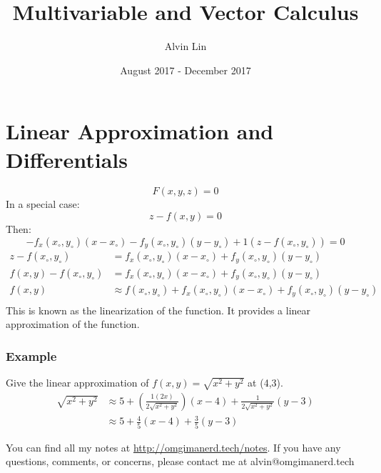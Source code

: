 \documentclass[letterpaper, 12pt]{math}
\title{Multivariable and Vector Calculus}
\author{Alvin Lin}
\date{August 2017 - December 2017}
\begin{document}
\maketitle

\section*{Linear Approximation and Differentials}
\[ F(x,y,z) = 0 \]
In a special case:
\[ z-f(x,y) = 0 \]
Then:
\[ -f_x(x_{\circ},y_{\circ})(x-x_{\circ})-f_y(x_{\circ},y_{\circ})(y-y_{\circ})+
  1(z-f(x_{\circ},y_{\circ})) = 0 \]
\begin{align*}
  z-f(x_{\circ},y_{\circ}) &= f_x(x_{\circ},y_{\circ})(x-x_{\circ})+
    f_y(x_{\circ},y_{\circ})(y-y_{\circ}) \\
  f(x,y)-f(x_{\circ},y_{\circ}) &= f_x(x_{\circ},y_{\circ})(x-x_{\circ})+
    f_y(x_{\circ},y_{\circ})(y-y_{\circ}) \\
  f(x,y) &\approx f(x_{\circ},y_{\circ})+f_x(x_{\circ},y_{\circ})(x-x_{\circ})+
    f_y(x_{\circ},y_{\circ})(y-y_{\circ}) \\
\end{align*}
This is known as the linearization of the function. It provides a linear
approximation of the function.

\subsubsection*{Example}
Give the linear approximation of \( f(x,y) = \sqrt{x^2+y^2} \) at (4,3).
\begin{align*}
  \sqrt{x^2+y^2} &\approx 5+(\frac{1(2x)}{2\sqrt{x^2+y^2}})(x-4)+
    \frac{1}{2\sqrt{x^2+y^2}}(y-3) \\
  &\approx 5+\frac{4}{5}(x-4)+\frac{3}{5}(y-3)
\end{align*}

\begin{center}
  You can find all my notes at \url{http://omgimanerd.tech/notes}. If you have
  any questions, comments, or concerns, please contact me at
  alvin@omgimanerd.tech
\end{center}
\end{document}
